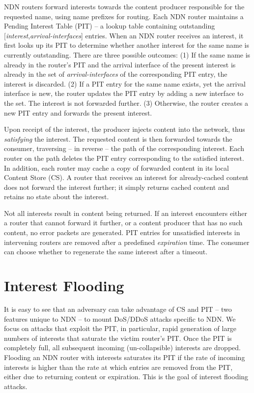 \documentclass[10pt,conference,letterpaper]{IEEEtran}
\begin{document}
NDN routers forward interests towards the content producer responsible for the requested 
name, using name prefixes 
for routing. 
Each NDN router maintains a Pending Interest Table (PIT) -- a lookup table containing 
outstanding [{\em interest},{\em arrival-interfaces}] entries.
When an NDN router receives an interest, it first looks up its PIT to determine
whether another interest for the same name is currently outstanding. There
are three possible outcomes: 
(1) If the same name is already in the router's 
PIT and the arrival interface of the present interest is already in the set of 
{\em arrival-interfaces} of the corresponding PIT entry, the interest is discarded. 
(2) If a PIT entry for the same name exists, yet the arrival interface is new, the
router updates the PIT entry by adding a new interface to the set. 
The interest is not forwarded further.
(3) Otherwise, the router creates a new PIT entry and forwards the 
present interest.

Upon receipt of the interest, the producer injects content into the network, thus 
{\em satisfying} the interest. The requested content is then forwarded towards the 
consumer, traversing -- in reverse -- the path of the corresponding interest. Each router 
on the path deletes the PIT entry corresponding to the satisfied interest.
In addition, each router may cache a copy of forwarded content in its local Content Store 
(CS).
A router that receives an interest for already-cached content does not forward the 
interest further; it simply returns cached content and retains no state about the 
interest.

Not all interests result in content being returned. If an interest encounters either a 
router that cannot forward it further, or a content producer that has no such content, no 
error packets are generated. PIT entries for unsatisfied interests in intervening routers 
are removed after a predefined {\em expiration} time. The consumer can choose whether to regenerate the same interest after a timeout.

\section{Interest Flooding}
\label{approaches}
It is easy to see that an adversary can take advantage of CS and PIT -- two features unique to 
NDN -- to mount DoS/DDoS attacks specific to NDN. We focus on attacks that exploit 
the PIT, in particular, rapid generation of large numbers of interests that saturate the victim 
router's PIT. Once the PIT is completely full, all subsequent incoming (un-collapsible) interests are dropped. 
Flooding an NDN router with interests saturates its PIT 
if the rate of incoming interests is higher than the rate at which entries are removed 
from the PIT, either due to returning content or expiration. This is the goal of 
interest flooding attacks.
\end{document}
